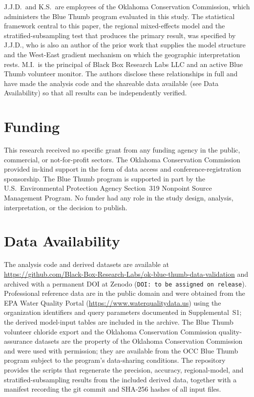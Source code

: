 \documentclass[lineno]{wlpeerj}
\begin{document}
J.J.D.\ and K.S.\ are employees of the Oklahoma Conservation Commission, which administers the Blue Thumb program evaluated in this study. The statistical framework central to this paper, the regional mixed-effects model and the stratified-subsampling test that produces the primary result, was specified by J.J.D., who is also an author of the prior work \citep{Dyer2025} that supplies the model structure and the West-East gradient mechanism on which the geographic interpretation rests. M.I.\ is the principal of Black Box Research Labs LLC and an active Blue Thumb volunteer monitor. The authors disclose these relationships in full and have made the analysis code and the shareable data available (see Data Availability) so that all results can be independently verified.

\section*{Funding}

This research received no specific grant from any funding agency in the public, commercial, or not-for-profit sectors. The Oklahoma Conservation Commission provided in-kind support in the form of data access and conference-registration sponsorship. The Blue Thumb program is supported in part by the U.S.\ Environmental Protection Agency Section~319 Nonpoint Source Management Program. No funder had any role in the study design, analysis, interpretation, or the decision to publish.

\section*{Data Availability}

The analysis code and derived datasets are available at \url{https://github.com/Black-Box-Research-Labs/ok-blue-thumb-data-validation} and archived with a permanent DOI at Zenodo (\texttt{DOI: to be assigned on release}). Professional reference data are in the public domain and were obtained from the EPA Water Quality Portal (\url{https://www.waterqualitydata.us}) using the organization identifiers and query parameters documented in Supplemental~S1; the derived model-input tables are included in the archive. The Blue Thumb volunteer chloride export and the Oklahoma Conservation Commission quality-assurance datasets are the property of the Oklahoma Conservation Commission and were used with permission; they are available from the OCC Blue Thumb program subject to the program's data-sharing conditions. The repository provides the scripts that regenerate the precision, accuracy, regional-model, and stratified-subsampling results from the included derived data, together with a manifest recording the git commit and SHA-256 hashes of all input files.
\end{document}
